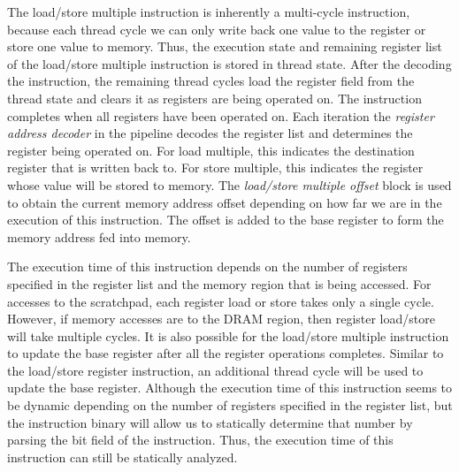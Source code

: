 The load/store multiple instruction is inherently a multi-cycle instruction, because each thread cycle we can only write back one value to the register or store one value to memory. 
Thus, the execution state and remaining register list of the load/store multiple instruction is stored in thread state.
After the decoding the instruction, the remaining thread cycles load the register field from the thread state and clears it as registers are being operated on. 
The instruction completes when all registers have been operated on.
Each iteration the \emph{register address decoder} in the pipeline decodes the register list and determines the register being operated on.
For load multiple, this indicates the destination register that is written back to.
For store multiple, this indicates the register whose value will be stored to memory.
The \emph{load/store multiple offset} block is used to obtain the current memory address offset depending on how far we are in the execution of this instruction.
The offset is added to the base register to form the memory address fed into memory.

The execution time of this instruction depends on the number of registers specified in the register list and the memory region that is being accessed. 
For accesses to the scratchpad, each register load or store takes only a single cycle. 
However, if memory accesses are to the DRAM region, then register load/store will take multiple cycles.
It is also possible for the load/store multiple instruction to update the base register after all the register operations completes. 
Similar to the load/store register instruction, an additional thread cycle will be used to update the base register.
Although the execution time of this instruction seems to be dynamic depending on the number of registers specified in the register list, but the instruction binary will allow us to statically determine that number by parsing the bit field of the instruction.
Thus, the execution time of this instruction can still be statically analyzed.   

